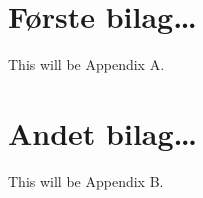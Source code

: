 \documentclass[
]{book}
\begin{document}
\appendix


\chapter{Første bilag\ldots{}}\label{bilag1}

This will be Appendix A.

\chapter{Andet bilag\ldots{}}\label{bilag2}

This will be Appendix B.
\end{document}
